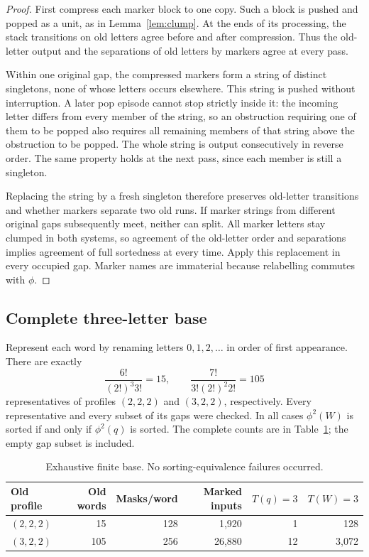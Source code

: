 \documentclass[11pt,a4paper]{article}
\begin{document}
\begin{proof}
First compress each marker block to one copy. Such a block is pushed and
popped as a unit, as in Lemma~\ref{lem:clump}. At the ends of its processing,
the stack transitions on old letters agree before and after compression.
Thus the old-letter output and the separations of old letters by markers
agree at every pass.

Within one original gap, the compressed markers form a string of distinct
singletons, none of whose letters occurs elsewhere. This string is pushed
without interruption. A later pop episode cannot stop strictly inside it:
the incoming letter differs from every member of the string, so an
obstruction requiring one of them to be popped also requires all remaining
members of that string above the obstruction to be popped. The whole string
is output consecutively in reverse order. The same property holds at the
next pass, since each member is still a singleton.

Replacing the string by a fresh singleton therefore preserves old-letter
transitions and whether markers separate two old runs. If marker strings
from different original gaps subsequently meet, neither can split. All
marker letters stay clumped in both systems, so agreement of the old-letter
order and separations implies agreement of full sortedness at every time.
Apply this replacement in every occupied gap. Marker names are immaterial
because relabelling commutes with $\phi$.
\end{proof}

\subsection*{Complete three-letter base}

Represent each word by renaming letters $0,1,2,\ldots$ in order of first
appearance. There are exactly
\[
 \frac{6!}{(2!)^3 3!}=15,
 \qquad
 \frac{7!}{3!(2!)^2 2!}=105
\]
representatives of profiles $(2,2,2)$ and $(3,2,2)$, respectively.
Every representative and every subset of its gaps were checked. In all
cases $\phi^2(W)$ is sorted if and only if $\phi^2(q)$ is sorted. The complete
counts are in Table~\ref{tab:base}; the empty gap subset is included.

\begin{table}[ht]
\centering
\small
\begin{tabular}{lrrrrr}
\toprule
Old profile & Old words & Masks/word & Marked inputs & $T(q)=3$ & $T(W)=3$\\
\midrule
$(2,2,2)$ & 15 & 128 & 1,920 & 1 & 128\\
$(3,2,2)$ & 105 & 256 & 26,880 & 12 & 3,072\\
\bottomrule
\end{tabular}
\caption{Exhaustive finite base. No sorting-equivalence failures occurred.}
\label{tab:base}
\end{table}
\end{document}
